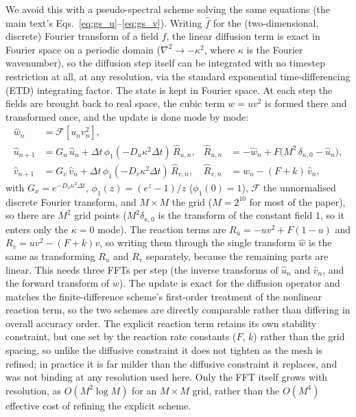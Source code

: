 \documentclass[11pt]{article}
\begin{document}
We avoid this with a pseudo-spectral scheme solving the same equations (the main text's Eqs.~\ref{eq:gs_u}--\ref{eq:gs_v}). Writing $\hat{f}$ for the (two-dimensional, discrete) Fourier transform of a field $f$, the linear diffusion term is exact in Fourier space on a periodic domain ($\nabla^2 \to -\kappa^2$, where $\kappa$ is the Fourier wavenumber), so the diffusion step itself can be integrated with no timestep restriction at all, at any resolution, via the standard exponential time-differencing (ETD) integrating factor. The state is kept in Fourier space. At each step the fields are brought back to real space, the cubic term $w=uv^2$ is formed there and transformed once, and the update is done mode by mode:
\begin{align}
\hat{w}_n &= \mathcal{F}\!\left[u_n v_n^{2}\right],\\
\hat{u}_{n+1} &= G_u\,\hat{u}_n + \Delta t\,\phi_1(-D_u\kappa^2\Delta t)\,\hat{R}_{u,n}, & \hat{R}_{u,n} &= -\hat{w}_n + F\bigl(M^{2}\,\delta_{\kappa,0} - \hat{u}_n\bigr),\\
\hat{v}_{n+1} &= G_v\,\hat{v}_n + \Delta t\,\phi_1(-D_v\kappa^2\Delta t)\,\hat{R}_{v,n}, & \hat{R}_{v,n} &= \hat{w}_n - (F+k)\,\hat{v}_n,
\end{align}
with $G_x = e^{-D_x\kappa^2\Delta t}$, $\phi_1(z)=(e^z-1)/z$ ($\phi_1(0)=1$), $\mathcal{F}$ the unnormalised discrete Fourier transform, and $M\times M$ the grid ($M=2^{10}$ for most of the paper), so there are $M^2$ grid points ($M^2\delta_{\kappa,0}$ is the transform of the constant field $1$, so it enters only the $\kappa=0$ mode). The reaction terms are $R_u=-uv^2+F(1-u)$ and $R_v=uv^2-(F+k)v$, so writing them through the single transform $\hat w$ is the same as transforming $R_u$ and $R_v$ separately, because the remaining parts are linear. This needs three FFTs per step (the inverse transforms of $\hat u_n$ and $\hat v_n$, and the forward transform of $w$). The update is exact for the diffusion operator and matches the finite-difference scheme's first-order treatment of the nonlinear reaction term, so the two schemes are directly comparable rather than differing in overall accuracy order. The explicit reaction term retains its own stability constraint, but one set by the reaction rate constants ($F$, $k$) rather than the grid spacing, so unlike the diffusive constraint it does not tighten as the mesh is refined; in practice it is far milder than the diffusive constraint it replaces, and was not binding at any resolution used here. Only the FFT itself grows with resolution, as $O(M^2 \log M)$ for an $M\times M$ grid, rather than the $O(M^4)$ effective cost of refining the explicit scheme.
\end{document}
